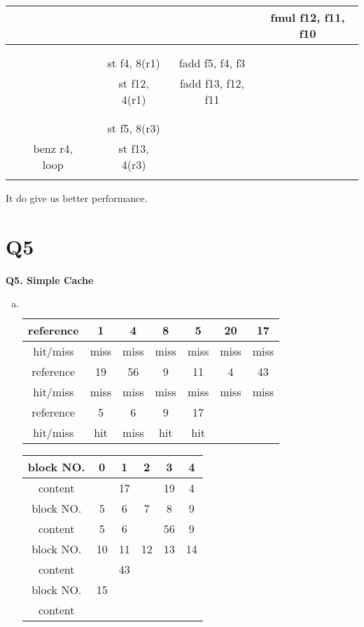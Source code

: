\documentclass[12pt]{article}
\begin{document}
\begin{CJK*}{UTF8}{gbsn}
\begin{enumerate}[a)]
\begin{table}[!hbp]
{\begin{tabular}{|c|c|c|c|c|c|}
\hline 
 &  &  &  &  & fmul f12, f11, f10 \\ 
\hline 
 &  &  &  &  &  \\ 
\hline 
 &  &  &  &  &  \\ 
\hline 
 &  &  & st f4, 8(r1) & fadd f5, f4, f3 &  \\ 
\hline 
 &  &  & st f12, 4(r1) & fadd f13, f12, f11 &  \\ 
\hline 
 &  &  &  &  &  \\ 
\hline 
 &  &  &  &  &  \\ 
\hline 
 &  &  & st f5, 8(r3) &  &  \\ 
\hline 
 & benz r4, loop &  & st f13, 4(r3) &  &  \\ 
\hline 
 &  &  &  &  &  \\ 
\hline 
\end{tabular} 
}
\end{table}

It do give us better performance.

\end{enumerate}

\section{Q5}
\textbf{Q5. Simple Cache}

\begin{enumerate}[a)]

\item
$ $\\
\begin{tabular}{|c|c|c|c|c|c|c|}
\hline 
reference	& 1 		& 4 		& 8 		&5& 20 	& 17 	 \\ 
\hline 
hit/miss		& miss 	& miss 	& miss 	&miss& miss 	& miss 	 \\ 
\hline 
reference &19& 56 & 9 & 11 & 4 & 43  \\ 
\hline 
hit/miss &miss& miss & miss & miss & miss & miss  \\ 
\hline
reference &5& 6 & 9 & 17 &&\\
\hline
hit/miss &hit& miss & hit &hit&&\\
\hline 
\end{tabular} 

\begin{tabular}{|c|c|c|c|c|c|}
\hline 
block NO. &0 & 1 & 2 & 3 & 4  \\ 
\hline 
content && 17 &  & 19 & 4  \\ 
\hline 
block NO. &5& 6 & 7 & 8 & 9  \\ 
\hline 
content &5& 6 &  & 56 & 9   \\ 
\hline 
block NO. &10& 11 & 12 & 13 & 14  \\ 
\hline 
content & & 43 &  &  &    \\ 
\hline
block NO. & 15 &&&&\\
\hline
content & &&&&\\
\hline 
\end{tabular} 


\end{enumerate}
\end{CJK*}
\end{document}
